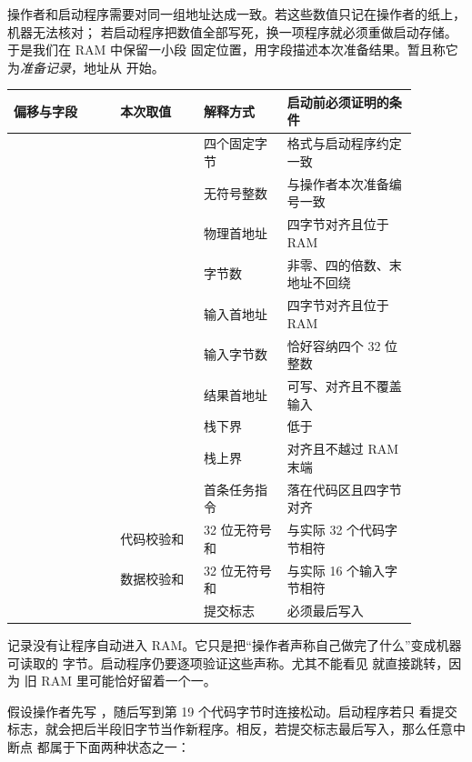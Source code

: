 操作者和启动程序需要对同一组地址达成一致。若这些数值只记在操作者的纸上，机器无法核对；
若启动程序把数值全部写死，换一项程序就必须重做启动存储。于是我们在 RAM 中保留一小段
固定位置，用字段描述本次准备结果。暂且称它为\emph{准备记录}，地址从
 开始。

\begin{longtable}{|L{0.23\linewidth}|L{0.18\linewidth}|L{0.18\linewidth}|L{0.29\linewidth}|}
\hline
{}
偏移与字段 & 本次取值 & 解释方式 & 启动前必须证明的条件 \\ \hline
{} &  & 四个固定字节 & 格式与启动程序约定一致 \\ \hline
{} &  & 无符号整数 & 与操作者本次准备编号一致 \\ \hline
{} &  & 物理首地址 & 四字节对齐且位于 RAM \\ \hline
{} &  & 字节数 & 非零、四的倍数、末地址不回绕 \\ \hline
{} &  & 输入首地址 & 四字节对齐且位于 RAM \\ \hline
{} &  & 输入字节数 & 恰好容纳四个 32 位整数 \\ \hline
{} &  & 结果首地址 & 可写、对齐且不覆盖输入 \\ \hline
{} &  & 栈下界 & 低于  \\ \hline
{} &  & 栈上界 & 对齐且不越过 RAM 末端 \\ \hline
{} &  & 首条任务指令 & 落在代码区且四字节对齐 \\ \hline
{} & 代码校验和 & 32 位无符号和 & 与实际 32 个代码字节相符 \\ \hline
{} & 数据校验和 & 32 位无符号和 & 与实际 16 个输入字节相符 \\ \hline
{} &  & 提交标志 & 必须最后写入 \\ \hline
\end{longtable}

记录没有让程序自动进入 RAM。它只是把“操作者声称自己做完了什么”变成机器可读取的
字节。启动程序仍要逐项验证这些声称。尤其不能看见  就直接跳转，因为
旧 RAM 里可能恰好留着一个一。


假设操作者先写 ，随后写到第 19 个代码字节时连接松动。启动程序若只
看提交标志，就会把后半段旧字节当作新程序。相反，若提交标志最后写入，那么任意中断点
都属于下面两种状态之一：


